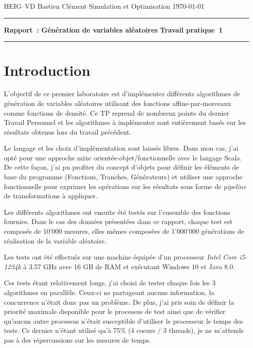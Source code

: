 \documentclass[a4paper,11pt]{article}
\begin{document}
	
{\sc HEIG--VD} \hfill Bastien Clément\newline 
Simulation et Optimisation \hfill \today \newline
\hrule
\vspace{2mm}
{\large \bf Rapport~: Génération de variables aléatoires} \hfill {\large \bf Travail pratique~1}
\vspace{4mm}
\hrule

\tableofcontents

\section{Introduction}

L'objectif de ce premier laboratoire est d'implémenter différents algorithmes de génération de variables aléatoires utilisant des fonctions affine-par-morceaux comme fonctions de densité. Ce TP reprend de nombreux points du dernier Travail Personnel et les algorithmes à implémenter sont entièrement basés sur les résultats obtenus lors du travail précédent.

Le langage et les choix d'implémentation sont laissés libres. Dans mon cas, j'ai opté pour une approche mixe orientée-objet/fonctionnelle avec le langage Scala. De cette façon, j'ai pu profiter du concept d'objets pour définir les éléments de base du programme (Fonctions, Tranches, Générateurs) et utiliser une approche fonctionnelle pour exprimer les opérations sur les résultats sous forme de \emph{pipeline} de transformations à appliquer.

Les différents algorithmes ont ensuite été testés sur l'ensemble des fonctions fournies. Dans le cas des données présentées dans ce rapport, chaque test est composés de 10'000 mesures, elles mêmes composées de 1'000'000 générations de réalisation de la variable aléatoire.

Les tests ont été effectués sur une machine équipée d'un processeur \emph{Intel Core i5-1234k} à 3.57 GHz avec 16 GB de RAM et exécutant Windows 10 et Java 8.0.

Ces tests étant relativement longs, j'ai choisi de tester chaque fois les 3 algorithmes en parallèle. Ceux-ci ne partageant aucune information, la concurrence n'était donc pas un problème. De plus, j'ai pris soin de définir la priorité maximale disponible pour le processus de test ainsi que de vérifier qu'aucun autre processus n'était susceptible d'utiliser le processeur le temps des tests. Ce dernier n'étant utilisé qu'à 75\% (4 coeurs / 3 threads), je ne m'attends pas à des répercussions sur les mesures de temps.
\end{document}
